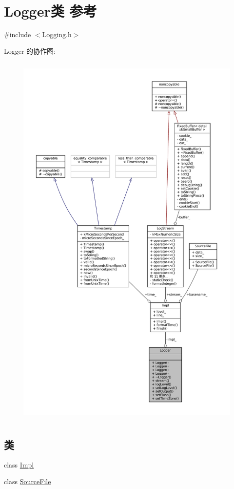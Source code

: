 \hypertarget{classmuduo_1_1Logger}{}\section{Logger类 参考}
\label{classmuduo_1_1Logger}


{\ttfamily \#include $<$Logging.\+h$>$}



Logger 的协作图\+:
\nopagebreak
\begin{figure}[H]
\begin{center}
\leavevmode
\includegraphics[height=550pt]{classmuduo_1_1Logger__coll__graph}
\end{center}
\end{figure}
\subsection*{类}
\begin{DoxyCompactItemize}
\item 
class \hyperlink{classmuduo_1_1Logger_1_1Impl}{Impl}
\item 
class \hyperlink{classmuduo_1_1Logger_1_1SourceFile}{Source\+File}
\end{DoxyCompactItemize}
